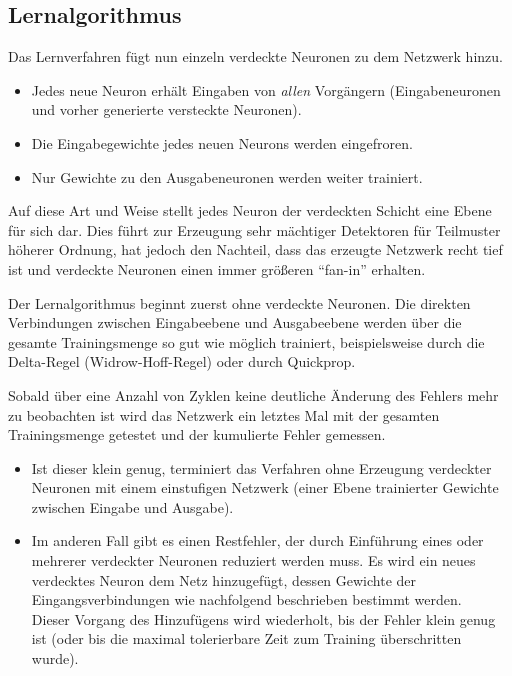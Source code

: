 \subsection*{Lernalgorithmus}
Das Lernverfahren fügt nun einzeln verdeckte Neuronen zu dem Netzwerk hinzu.
\begin{itemize}
	\item Jedes neue Neuron erhält Eingaben von \emph{allen} Vorgängern (Eingabeneuronen und vorher generierte versteckte Neuronen).
	\item Die Eingabegewichte jedes neuen Neurons werden eingefroren.
	\item Nur Gewichte zu den Ausgabeneuronen werden weiter trainiert.
\end{itemize}

Auf diese Art und Weise stellt jedes Neuron der verdeckten Schicht eine Ebene für sich dar. Dies führt zur Erzeugung sehr mächtiger Detektoren für Teilmuster höherer Ordnung, hat jedoch den Nachteil, dass das erzeugte Netzwerk recht tief ist und verdeckte Neuronen einen immer größeren "`fan-in"' erhalten.

Der Lernalgorithmus beginnt zuerst ohne verdeckte Neuronen. Die direkten Verbindungen zwischen Eingabeebene und Ausgabeebene werden über die gesamte Trainingsmenge so gut wie möglich trainiert, beispielsweise durch die Delta-Regel (Widrow-Hoff-Regel) oder durch Quickprop.

Sobald über eine Anzahl von Zyklen keine deutliche Änderung des Fehlers mehr zu beobachten ist wird das Netzwerk ein letztes Mal mit der gesamten Trainingsmenge getestet und der kumulierte Fehler gemessen. 

\begin{itemize}
	\item Ist dieser klein genug, terminiert das Verfahren ohne Erzeugung verdeckter Neuronen mit einem einstufigen Netzwerk (einer Ebene trainierter Gewichte zwischen Eingabe und Ausgabe).
	\item Im anderen Fall gibt es einen Restfehler, der durch Einführung eines oder mehrerer verdeckter Neuronen reduziert werden muss. Es wird ein neues verdecktes Neuron dem Netz hinzugefügt, dessen Gewichte der Eingangsverbindungen wie nachfolgend beschrieben bestimmt werden. \\
	Dieser Vorgang des Hinzufügens wird wiederholt, bis der Fehler klein genug ist (oder bis die maximal tolerierbare Zeit zum Training überschritten wurde).
\end{itemize}

